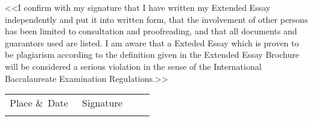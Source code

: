 <<I confirm with my signature that I have written my Extended Essay independently and put it into written form, that the involvement of other persons has been limited to consultation and proofreading, and that all documents and guarantors used are listed. I am aware that a Exteded Essay which is proven to be plagiarism according to the definition given in the Extended Essay Brochure will be considered a serious violation in the sense of the International Baccalaureate Examination Regulations.>>
\vspace{3cm}

\noindent
\begin{tabular}{p{0.47\linewidth}p{0.47\linewidth}}
  Place \&\ Date & Signature \\
  & \\[1cm]
  \hline
\end{tabular}

